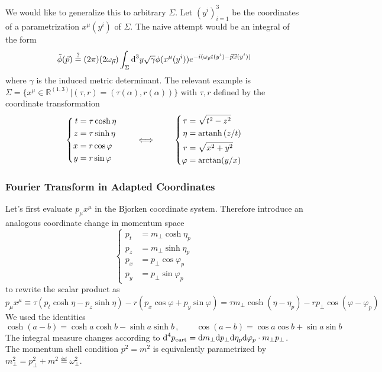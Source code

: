 We would like to generalize this to arbitrary $\Sigma$. Let $(y^i)_{i=1}^3$ be the coordinates of a parametrization $x^\mu(y^i)$ of $\Sigma$. The naive attempt would be an integral of the form
\begin{equation}
    \tilde{\phi}(\vec{p})\overset{?}{=}(2\pi)(2\omega_{\vec{p}})\int_\Sigma\text{d}^3y\sqrt{\gamma}\phi(x^\mu(y^i))e^{-{i}(\omega_{\vec{p}}t(y^i)-\vec{p}\vec{x}(y^i))}
\end{equation}
where $\gamma$ is the induced metric determinant. The relevant example is $\Sigma=\{x^\mu\in\mathbb{R}^{(1,3)}\vert (\tau,r)=(\tau(\alpha),r(\alpha))\}$ with $\tau,r$ defined by the coordinate transformation
\begin{equation}
    \left\{\begin{split}
        t&=\tau\cosh\eta\\
        z&=\tau\sinh\eta\\
        x&=r\cos\varphi\\
        y&=r\sin\varphi
    \end{split}\right.
    \qquad\iff\qquad
    \left\{\begin{split}
        \tau&=\sqrt{t^2-z^2}\\
        \eta&={\text{artanh}\,}(z/t)\\
        r&=\sqrt{x^2+y^2}\\
        \varphi&=\arctan(y/x)
    \end{split}\right.
\end{equation}

\subsubsection{Fourier Transform in Adapted Coordinates}

Let's first evaluate $p_\mu x^\mu$ in the Bjorken coordinate system. Therefore introduce an analogous coordinate change in momentum space
\begin{equation}
    \left\{\begin{split}
        p_t&=m_\perp\cosh\eta_p\\
        p_z&=m_\perp\sinh\eta_p\\
        p_x&=p_\perp\cos\varphi_p\\
        p_y&=p_\perp\sin\varphi_p
    \end{split}\right.
\end{equation}
to rewrite the scalar product as
\begin{equation}
    p_\mu x^\mu\equiv\tau(p_t\cosh\eta-p_z\sinh\eta)-r(p_x\cos\varphi+p_y\sin\varphi)=\tau m_\perp\cosh(\eta-\eta_p)-r p_\perp\cos(\varphi-\varphi_p)
\end{equation}
We used the identities
\begin{equation}
    \cosh(a-b)=\cosh a\cosh b-\sinh a\sinh b\,,\qquad\cos(a-b)=\cos a\cos b+\sin a\sin b
\end{equation}
The integral measure changes according to $\text{d}^4p_{\text{cart}}=\text{d} m_\perp\text{d} p_\perp\text{d}\eta_p\text{d}\varphi_p\cdot m_\perp p_\perp$. The momentum shell condition $p^2=m^2$ is equivalently parametrized by $m_\perp^2=p_\perp^2+m^2\eqdef \omega_\perp^2$.

